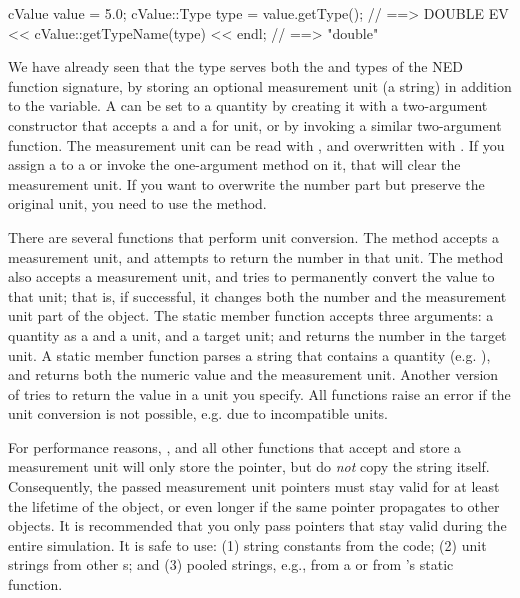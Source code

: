 \begin{cpp}
cValue value = 5.0;
cValue::Type type = value.getType(); // ==> DOUBLE
EV << cValue::getTypeName(type) << endl; // ==> "double"
\end{cpp}

We have already seen that the  type serves both the
 and  types of the NED function
signature, by storing an optional measurement unit (a string)
in addition to the  variable. A  can be set
to a quantity by creating it with a two-argument constructor that accepts
a  and a  for unit, or by invoking a similar
two-argument  function. The measurement unit can be read with
, and overwritten with . If you assign a
 to a  or invoke the one-argument
 method on it, that will clear the measurement unit. If you
want to overwrite the number part but preserve the original unit, you need
to use the  method.

There are several functions that perform unit conversion. The
 method accepts a measurement unit, and attempts
to return the number in that unit. The  method also
accepts a measurement unit, and tries to permanently convert the value to
that unit; that is, if successful, it changes both the number and the
measurement unit part of the object. The  static
 member function accepts three arguments: a quantity as a
 and a unit, and a target unit; and returns the number in the
target unit. A  static member function parses
a string that contains a quantity (e.g. ), and returns
both the numeric value and the measurement unit. Another version of
 tries to return the value in a unit you specify.
All functions raise an error if the unit conversion is not possible, e.g.
due to incompatible units.

For performance reasons, ,  and all other
functions that accept and store a measurement unit will only store the
 pointer, but do \textit{not} copy the string itself.
Consequently, the passed measurement unit pointers must stay valid for at
least the lifetime of the  object, or even longer if the
same pointer propagates to other  objects. It is
recommended that you only pass pointers that stay valid during the entire
simulation. It is safe to use: (1) string constants from the code; (2) unit
strings from other s; and (3) pooled strings, e.g., from a
 or from 's static 
function.


